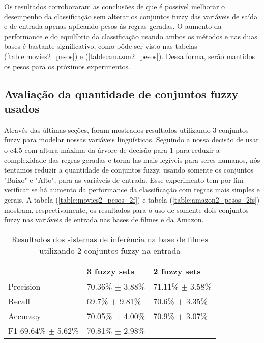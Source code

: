 Os resultados corroboraram as conclusões de \cite{ishibuchi2001effect} que é possível melhorar o desempenho da classificação sem alterar os conjuntos fuzzy das variáveis de saída e de entrada apenas aplicando pesos às regras geradas. O aumento da performance e do equilíbrio da classificação usando ambos os métodos e nas duas bases é bastante significativo, como pôde ser visto nas tabelas (\ref{table:movies2_pesos}) e (\ref{table:amazon2_pesos}). Dessa forma, serão mantidos os pesos para os próximos experimentos. 

\subsection{Avaliação da quantidade de conjuntos fuzzy usados}

Através das últimas seções, foram mostrados resultados utilizando 3 conjuntos fuzzy para modelar nossas variáveis lingüísticas. Seguindo a nossa decisão de usar o c4.5 com altura máxima da árvore de decisão para 1 para reduzir a complexidade das regras geradas e torna-las mais legíveis para seres humanos, nós tentamos reduzir a quantidade de conjuntos fuzzy, usando somente os conjuntos "Baixo" e "Alto", para as variáveis de entrada. Esse experimento tem por fim verificar se há aumento da performance da classificação com regras mais simples e gerais. A tabela (\ref{table:movies2_pesos_2f}) e tabela (\ref{table:amazon2_pesos_2fs}) mostram, respectivamente, os resultados para o uso de somente dois conjuntos fuzzy nas variáveis de entrada nas bases de filmes e da Amazon.

\begin{table}[!h]
    \begin{tabular}{lll}
    ~         		& 3 fuzzy sets 							& 2 fuzzy sets \\ \hline
    Precision 	& 70.36\% $\pm$ 3.88\%       & 71.11\% $\pm$ 3.58\%    \\
    Recall    	& 69.7\% $\pm$ 9.81\%    		& 70.6\% $\pm$ 3.35\%   \\
    Accuracy  	& 70.05\% $\pm$ 4.00\%    	& 70.9\% $\pm$ 3.07\%    \\
    F1  				69.64\% $\pm$ 5.62\%    		& 70.81\% $\pm$ 2.98\%    \\
    \end{tabular}
    \caption{Resultados dos sistemas de inferência na base de filmes utilizando 2 conjuntos fuzzy na entrada}
	\label{table:movies2_pesos_2fs}
\end{table}

